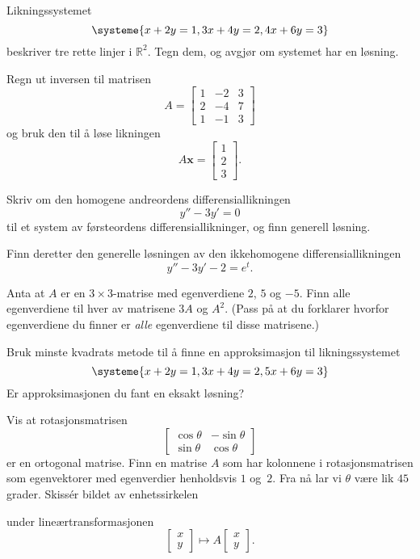 \documentclass[titlepage,a4paper,12pt,norsk]{IMFeksamen}
\newcommand{\V}[1]{\mathbf{#1}}
\newcommand{\vv}[2]{\begin{bmatrix} #1 \\ #2 \end{bmatrix}}
\newcommand{\vvv}[3]{\begin{bmatrix} #1 \\ #2 \\ #3 \end{bmatrix}}
\newcommand{\x}{\V{x}}
\newcommand{\0}{\V{0}}
\begin{document}
\begin{oppgave}
Likningssystemet 
\[
\systeme{
x + 2y = 1,
3x + 4y = 2,
4x + 6y = 3
}
\]
beskriver tre rette linjer i $\mathbb R^2$. Tegn dem, og avgjør om systemet har en løsning.
\end{oppgave}


\begin{oppgave}
Regn ut inversen til matrisen
\[
A =
\begin{bmatrix}
1 & -2 & 3 \\
2 & -4 & 7 \\
1 & -1 & 3
\end{bmatrix}
\]
og bruk den til å løse likningen
\[
A \x = \vvv{1}{2}{3}.
\]
\end{oppgave}


\begin{oppgave}
Skriv om den homogene andreordens differensiallikningen
\[
y''-3y'= 0
\]
til et system av førsteordens differensiallikninger,
og finn generell løsning.

Finn deretter den generelle løsningen av den ikkehomogene
differensiallikningen
\[
y''-3y'-2 = e^t.
\]
\end{oppgave}


\begin{oppgave}
Anta at $A$ er en $3 \times 3$-matrise med egenverdiene $2$, $5$ og $-5$.
Finn alle egenverdiene til hver av matrisene $3A$ og $A^2$.
(Pass på at du forklarer hvorfor egenverdiene du finner er \emph{alle} egenverdiene
til disse matrisene.)
\end{oppgave}


\begin{oppgave}
Bruk minste kvadrats metode til å finne en approksimasjon til likningssystemet
\[
\systeme{
x + 2y = 1,
3x + 4y = 2,
5x + 6y = 3
}
\]
Er approksimasjonen du fant en eksakt løsning?
\end{oppgave}


\begin{oppgave}
Vis at rotasjonsmatrisen 
\[
\begin{bmatrix}
\cos \theta  & -\sin \theta  \\  \sin \theta & \cos \theta 
\end{bmatrix}
\]
er en ortogonal matrise.  Finn en matrise $A$ som har kolonnene i rotasjonsmatrisen som egenvektorer med egenverdier henholdsvis $1$ og~$2$. Fra nå lar vi $\theta$ være lik $45$ grader. Skissér bildet av enhetssirkelen
\begin{center}
\end{center}
under lineærtransformasjonen
\[
\vv{x}{y}\mapsto A\vv{x}{y}.
\]
\end{oppgave}
\end{document}
